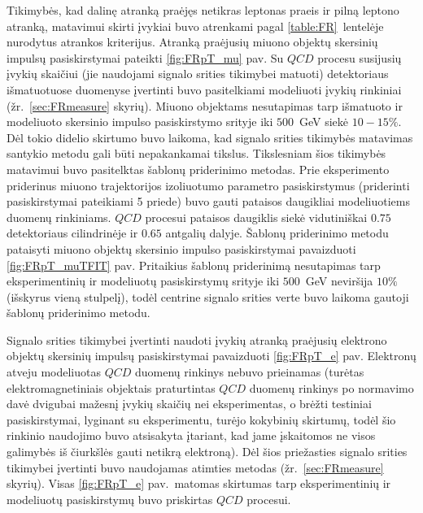 \documentclass[a4paper, 12pt, oneside]{article}
\newcommand{\QCD}{QC\! D}
\begin{document}
Tikimybės, kad dalinę atranką praėjęs netikras leptonas praeis ir pilną leptono atranką, matavimui skirti įvykiai buvo
atrenkami pagal \ref{table:FR}~lentelėje nurodytus atrankos kriterijus.
Atranką praėjusių miuono objektų skersinių impulsų pasiskirstymai pateikti \ref{fig:FRpT_mu} pav.
Su $\QCD$ procesu susijusių įvykių skaičiui (jie naudojami signalo srities tikimybei matuoti) detektoriaus išmatuotuose
duomenyse įvertinti buvo pasitelkiami modeliuoti įvykių rinkiniai (žr.\ \ref{sec:FRmeasure} skyrių).
Miuono objektams nesutapimas tarp išmatuoto ir modeliuoto skersinio impulso pasiskirstymo srityje iki $500$~GeV siekė $10-15\%$.
Dėl tokio didelio skirtumo buvo laikoma, kad signalo srities tikimybės matavimas santykio metodu gali būti nepakankamai tikslus.
Tikslesniam šios tikimybės matavimui buvo pasitelktas šablonų priderinimo metodas.
Prie eksperimento priderinus miuono trajektorijos izoliuotumo parametro pasiskirstymus (priderinti pasiskirstymai pateikiami 5 priede)
buvo gauti pataisos daugikliai modeliuotiems duomenų rinkiniams.
$\QCD$ procesui pataisos daugiklis siekė vidutiniškai $0.75$ detektoriaus cilindrinėje ir $0.65$ antgalių dalyje.
Šablonų priderinimo metodu pataisyti miuono objektų skersinio impulso pasiskirstymai pavaizduoti \ref{fig:FRpT_muTFIT} pav.
Pritaikius šablonų priderinimą nesutapimas tarp eksperimentinių ir modeliuotų pasiskirstymų srityje iki $500$~GeV neviršija $10\%$
(išskyrus vieną stulpelį), todėl centrine signalo srities verte buvo laikoma gautoji šablonų priderinimo metodu.

Signalo srities tikimybei įvertinti naudoti įvykių atranką praėjusių elektrono objektų skersinių impulsų pasiskirstymai
pavaizduoti \ref{fig:FRpT_e} pav.
Elektronų atveju modeliuotas $\QCD$ duomenų rinkinys nebuvo prieinamas (turėtas elektromagnetiniais objektais praturtintas
$\QCD$ duomenų rinkinys po normavimo davė dvigubai mažesnį įvykių skaičių nei eksperimentas, o brėžti testiniai pasiskirstymai,
lyginant su eksperimentu, turėjo kokybinių skirtumų, todėl šio rinkinio naudojimo buvo atsisakyta įtariant, kad jame įskaitomos
ne visos galimybės iš čiurkšlės gauti netikrą elektroną).
Dėl šios priežasties signalo srities tikimybei įvertinti buvo naudojamas atimties metodas (žr.\ \ref{sec:FRmeasure} skyrių).
Visas \ref{fig:FRpT_e} pav.\ matomas skirtumas tarp eksperimentinių ir modeliuotų pasiskirstymų buvo priskirtas $\QCD$ procesui.
\end{document}
